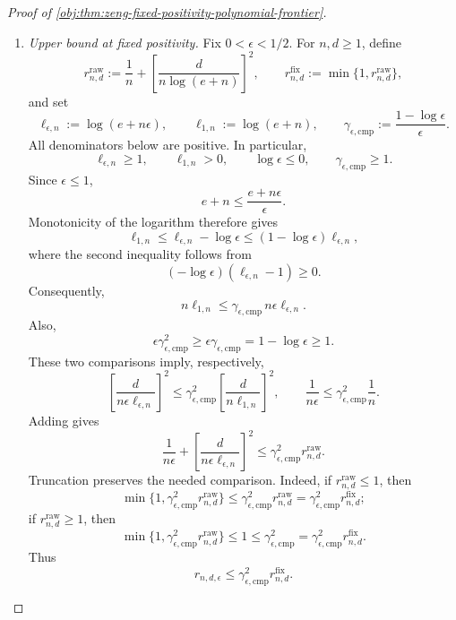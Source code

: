 \begin{proof}[Proof of \cref{obj:thm:zeng-fixed-positivity-polynomial-frontier}]
\begin{enumerate}
\item \textit{Upper bound at fixed positivity.}
Fix \(0<\epsilon<1/2\). For \(n,d\ge1\), define
\[
r^{\mathrm{raw}}_{n,d}
:=
\frac1n+\left[\frac d{n\log(e+n)}\right]^2,
\qquad
r^{\mathrm{fix}}_{n,d}:=\min\{1,r^{\mathrm{raw}}_{n,d}\},
\]
and set
\[
\ell_{\epsilon,n}:=\log(e+n\epsilon),
\qquad
\ell_{1,n}:=\log(e+n),
\qquad
\gamma_{\epsilon,\mathrm{cmp}}
:=\frac{1-\log\epsilon}{\epsilon}.
\]
All denominators below are positive. In particular,
\[
\ell_{\epsilon,n}\ge1,
\qquad
\ell_{1,n}>0,
\qquad
\log\epsilon\le0,
\qquad
\gamma_{\epsilon,\mathrm{cmp}}\ge1.
\]
Since \(\epsilon\le1\),
\[
e+n\le\frac{e+n\epsilon}{\epsilon}.
\]
Monotonicity of the logarithm therefore gives
\[
\ell_{1,n}
\le \ell_{\epsilon,n}-\log\epsilon
\le (1-\log\epsilon)\ell_{\epsilon,n},
\]
where the second inequality follows from
\[
(-\log\epsilon)(\ell_{\epsilon,n}-1)\ge0.
\]
Consequently,
\[
n\ell_{1,n}
\le
\gamma_{\epsilon,\mathrm{cmp}}\,
n\epsilon\ell_{\epsilon,n}.
\]
Also,
\[
\epsilon\gamma_{\epsilon,\mathrm{cmp}}^2
\ge
\epsilon\gamma_{\epsilon,\mathrm{cmp}}
=
1-\log\epsilon
\ge1.
\]
These two comparisons imply, respectively,
\[
\left[\frac d{n\epsilon\ell_{\epsilon,n}}\right]^2
\le
\gamma_{\epsilon,\mathrm{cmp}}^2
\left[\frac d{n\ell_{1,n}}\right]^2,
\qquad
\frac1{n\epsilon}
\le
\gamma_{\epsilon,\mathrm{cmp}}^2\frac1n.
\]
Adding gives
\[
\frac1{n\epsilon}
+\left[\frac d{n\epsilon\ell_{\epsilon,n}}\right]^2
\le
\gamma_{\epsilon,\mathrm{cmp}}^2 r^{\mathrm{raw}}_{n,d}.
\]
Truncation preserves the needed comparison. Indeed, if
\(r^{\mathrm{raw}}_{n,d}\le1\), then
\[
\min\{1,\gamma_{\epsilon,\mathrm{cmp}}^2r^{\mathrm{raw}}_{n,d}\}
\le
\gamma_{\epsilon,\mathrm{cmp}}^2r^{\mathrm{raw}}_{n,d}
=
\gamma_{\epsilon,\mathrm{cmp}}^2r^{\mathrm{fix}}_{n,d};
\]
if \(r^{\mathrm{raw}}_{n,d}\ge1\), then
\[
\min\{1,\gamma_{\epsilon,\mathrm{cmp}}^2r^{\mathrm{raw}}_{n,d}\}
\le1
\le
\gamma_{\epsilon,\mathrm{cmp}}^2
=
\gamma_{\epsilon,\mathrm{cmp}}^2r^{\mathrm{fix}}_{n,d}.
\]
Thus
\[
r_{n,d,\epsilon}
\le
\gamma_{\epsilon,\mathrm{cmp}}^2r^{\mathrm{fix}}_{n,d}.
\]


\end{enumerate}
\end{proof}
